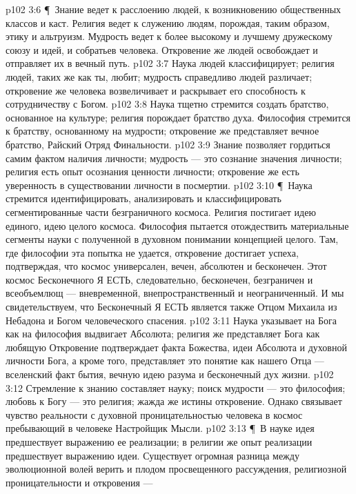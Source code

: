 \vs p102 3:6 \P\ Знание ведет к расслоению людей, к возникновению общественных классов и каст. Религия ведет к служению людям, порождая, таким образом, этику и альтруизм. Мудрость ведет к более высокому и лучшему дружескому союзу и идей, и собратьев человека. Откровение же людей освобождает и отправляет их в вечный путь.
\vs p102 3:7 Наука людей классифицирует; религия людей, таких же как ты, любит; мудрость справедливо людей различает; откровение же человека возвеличивает и раскрывает его способность к сотрудничеству с Богом.
\vs p102 3:8 Наука тщетно стремится создать братство, основанное на культуре; религия порождает братство духа. Философия стремится к братству, основанному на мудрости; откровение же представляет вечное братство, Райский Отряд Финальности.
\vs p102 3:9 Знание позволяет гордиться самим фактом наличия личности; мудрость --- это сознание значения личности; религия есть опыт осознания ценности личности; откровение же есть уверенность в существовании личности в посмертии.
\vs p102 3:10 \P\ Наука стремится идентифицировать, анализировать и классифицировать сегментированные части безграничного космоса. Религия постигает идею единого, идею целого космоса. Философия пытается отождествить материальные сегменты науки с полученной в духовном понимании концепцией целого. Там, где философии эта попытка не удается, откровение достигает успеха, подтверждая, что космос универсален, вечен, абсолютен и бесконечен. Этот космос Бесконечного Я ЕСТЬ, следовательно, бесконечен, безграничен и всеобъемлющ --- вневременной, внепространственный и неограниченный. И мы свидетельствуем, что Бесконечный Я ЕСТЬ является также Отцом Михаила из Небадона и Богом человеческого спасения.
\vs p102 3:11 Наука указывает на Бога как на  философия выдвигает  Абсолюта; религия же представляет Бога как любящую  Откровение подтверждает  факта Божества, идеи Абсолюта и духовной личности Бога, а кроме того, представляет это понятие как нашего Отца --- вселенский факт бытия, вечную идею разума и бесконечный дух жизни.
\vs p102 3:12 Стремление к знанию составляет науку; поиск мудрости --- это философия; любовь к Богу --- это религия; жажда же истины  откровение. Однако связывает чувство реальности с духовной проницательностью человека в космос пребывающий в человеке Настройщик Мысли.
\vs p102 3:13 \P\ В науке идея предшествует выражению ее реализации; в религии же опыт реализации предшествует выражению идеи. Существует огромная разница между эволюционной волей верить и плодом просвещенного рассуждения, религиозной проницательности и откровения --- 
